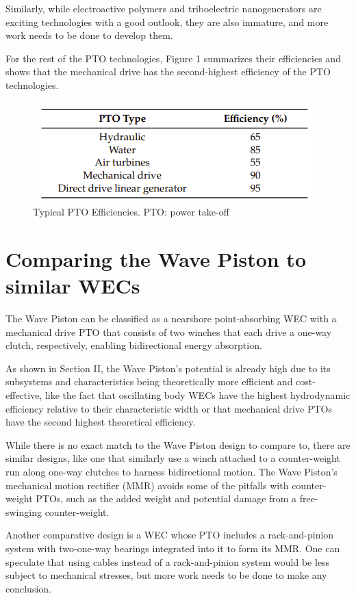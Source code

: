\documentclass[journal]{IEEEtran}
\begin{document}
    Similarly, while electroactive polymers and triboelectric nanogenerators are exciting technologies with a good outlook, they are also immature, and more work needs to be done to develop them\cite{osti_1897711}.

    For the rest of the PTO technologies, Figure 1 summarizes their efficiencies and shows that the mechanical drive has the second-highest efficiency of the PTO technologies\cite{en12224329}.
    \begin{figure}[htbp]
    \centerline{\includegraphics{images/pto_efficiencies_table.png}}
    \caption{Typical PTO Efficiencies. PTO: power take-off}
    \label{fig}
    \end{figure}

\section{Comparing the Wave Piston to similar WECs}
The Wave Piston can be classified as a nearshore point-absorbing WEC with a mechanical drive PTO that consists of two winches that each drive a one-way clutch, respectively, enabling bidirectional energy absorption.

As shown in Section II, the Wave Piston's potential is already high due to its subsystems and characteristics being theoretically more efficient and cost-effective, like the fact that oscillating body WECs have the highest hydrodynamic efficiency relative to their characteristic width or that mechanical drive PTOs have the second highest theoretical efficiency\cite{en12224329}.

While there is no exact match to the Wave Piston design to compare to, there are similar designs, like one that similarly use a winch attached to a counter-weight run along one-way clutches to harness bidirectional motion\cite{LOK20141}. The Wave Piston's mechanical motion rectifier (MMR) avoids some of the pitfalls with counter-weight PTOs, such as the added weight and potential damage from a free-swinging counter-weight\cite{nachev2017comparative}.

Another comparative design is a WEC whose PTO includes a rack-and-pinion system with two-one-way bearings integrated into it to form its MMR\cite{LIANG2017190}. One can speculate that using cables instead of a rack-and-pinion system would be less subject to mechanical stresses, but more work needs to be done to make any conclusion.
\end{document}
